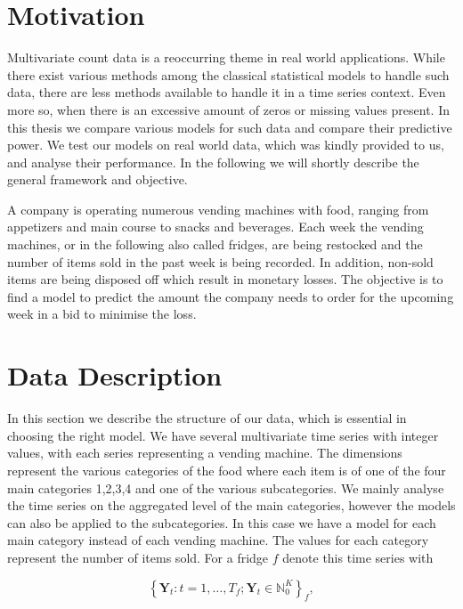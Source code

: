 \section{Motivation}
\label{sec:Motivation}

Multivariate count data is a reoccurring theme in real world applications. While there exist various methods among the classical statistical models to handle such data, there are less methods available to handle it in a time series context. Even more so, when there is an excessive amount of zeros or missing values present. In this thesis we compare various models for such data and compare their predictive power. We test our models on real world data, which was kindly provided to us, and analyse their performance. In the following we will shortly describe the general framework and objective. 

A company is operating numerous vending machines with food, ranging from appetizers and main course to snacks and beverages. Each week the vending machines, or in the following also called fridges, are being restocked and the number of items sold in the past week is being recorded. In addition, non-sold items are being disposed off which result in monetary losses. The objective is to find a model to predict the amount the company needs to order for the upcoming week in a bid to minimise the loss.

\section{Data Description}
\label{sec: Data Description}

In this section we describe the structure of our data, which is essential in choosing the right model. We have several multivariate time series with integer values, with each series representing a vending machine. The dimensions represent the various categories of the food where each item is of one of the four main categories 1,2,3,4 and one of the various subcategories. We mainly analyse the time series on the aggregated level of the main categories, however the models can also be applied to the subcategories. In this case we have a model for each main category instead of each vending machine. The values for each category represent the number of items sold. For a fridge $f$ denote this time series with 

\begin{equation}
\left\{\bm{Y}_t:t=1,\ldots,T_f; \bm{Y}_t \in \mathbb{N}_0^K \right\}_f,
\label{eq:time series definition}
\end{equation}

